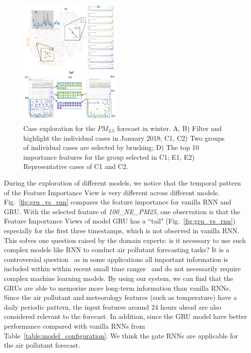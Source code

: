 \begin{figure}[t]
	\centering
	\includegraphics[width=0.45\textwidth]{figure/MultiRNNExplorer/Evaluation/winter_exploration.pdf}
	\vspace{-3mm}
	\caption{Case exploration for the $PM_{2.5}$ forecast in winter. A, B) Filter and highlight the individual cases in January 2018; C1, C2) Two groups of individual cases are selected by brushing; D) The top 10 importance features for the group selected in C1; E1, E2) Representative cases of C1 and C2.}
	\label{fig:winter_exploration}
	\vspace{-4mm}
\end{figure}
During the exploration of different models, we notice that the temporal pattern of the Feature Importance View is very different across different models. 
Fig.~\ref{fig:gru_vs_rnn} compares the feature importance for vanilla RNN and GRU.
With the selected feature of \textit{100\_NE\_PM25}, one observation is that the Feature Importance Views of model GRU has a ``tail" (Fig.~\ref{fig:gru_vs_rnn}) especially for the first three timestamps, which is not observed in vanilla RNN.
This solves one question raised by the domain experts: is it necessary to use such complex models like RNN to conduct air pollutant forecasting tasks?
It is a controversial question~\cite{brownlee2017long} as in some applications all important information is included within within recent small time ranges~\cite{gers2002applying} and do not necessarily require complex machine learning models. 
By using our system, we can find that the GRUs are able to memorize more long-term information than vanilla RNNs. 
Since the air pollutant and meteorology features (such as temperature) have a daily periodic pattern, the input features around 24 hours ahead are also considered relevant to the forecast. 
In addition, since the GRU model have better performance compared with vanilla RNNs from Table~\ref{table:model_configuration}. 
We think the gate RNNs are applicable for the air pollutant forecast. 

